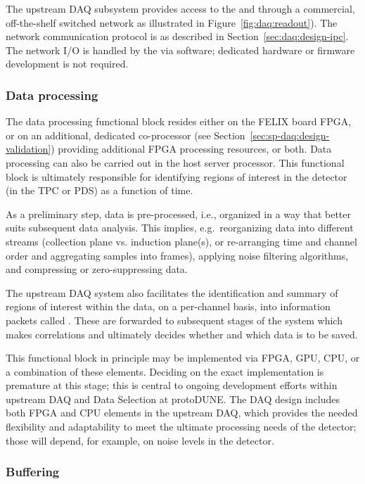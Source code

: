 The upstream DAQ subsystem provides access to the  and  through a commercial, off-the-shelf switched network as illustrated in Figure~\ref{fig:daq:readout}).
The network communication protocol is as described in Section~\ref{sec:daq:design-ipc}.
The network I/O is handled by the  via software; dedicated hardware or firmware development is not required.

\subsubsection{Data processing}
\label{sec:fd-daq:upstream-proc}

The data processing functional block resides either on the FELIX board FPGA, or on
an additional, dedicated co-processor (see Section~\ref{sec:sp-daq:design-validation}) providing additional FPGA
processing resources, or both. Data processing can also be carried out in the host
server processor. This functional block is ultimately
responsible for identifying regions of interest in the
detector (in the TPC or PDS) as a function of time.

As a preliminary step, data is pre-processed, i.e., organized in a way
that better suits subsequent data analysis. This implies, e.g.~reorganizing
data into different streams (collection plane vs. induction plane(s),
or re-arranging time and channel order and aggregating samples into frames), applying noise filtering algorithms, and compressing or zero-suppressing data.

The upstream DAQ system also facilitates the identification and
summary of regions of interest within the data, 
on a per-channel basis, into information packets
called .  These are forwarded to subsequent
stages of the
 system which makes correlations and ultimately decides whether and which data is to be saved.

This functional block in principle may be implemented via FPGA, GPU, CPU, or a
combination of these elements. Deciding on the exact implementation is
premature at this stage; this is central to ongoing development efforts 
within upstream DAQ and Data Selection at protoDUNE. The DAQ design includes both FPGA and
CPU elements in the upstream DAQ, which provides the needed
flexibility and 
adaptability to meet the ultimate processing needs of the detector;
those will depend, for example, on noise levels in the detector.

\subsubsection{Buffering}
\label{sec:fd-daq:upstream-buf}

